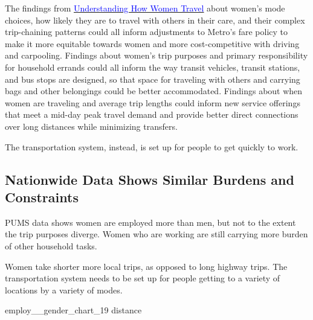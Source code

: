 \documentclass[
  12pt,
]{article}
\newenvironment{Shaded}{\begin{snugshade}}{\end{snugshade}}
\newcommand{\NormalTok}[1]{#1}
\begin{document}
\begin{flushleft}
The findings from \href{https://thesource.metro.net/2019/09/19/metro-releases-understanding-how-women-travel-report/}{\underline{\textcolor{blue}{Understanding How Women Travel}}} about women’s mode choices, how likely they are to travel with others in their care, and their complex trip-chaining patterns could all inform adjustments to Metro’s fare policy to make it more equitable towards women and more cost-competitive with driving and carpooling. Findings about women’s trip purposes and primary responsibility for household errands could all inform the way transit vehicles, transit stations, and bus stops are designed, so that space for traveling with others and carrying bags and other belongings could be better accommodated. Findings about when women are traveling and average trip lengths could inform new service offerings that meet a mid-day peak travel demand and provide better direct connections over long distances while minimizing transfers. 

The transportation system, instead, is set up for people to get quickly to work.
\end{flushleft}

\hypertarget{nationwide-data-shows-similar-burdens-and-constraints}{%
\subsection{Nationwide Data Shows Similar Burdens and
Constraints}\label{nationwide-data-shows-similar-burdens-and-constraints}}

\begin{flushleft}
PUMS data shows women are employed more than men, but not to the extent the trip purposes diverge. Women who are working are still carrying more burden of other household tasks.
\end{flushleft}

\begin{flushleft}
Women take shorter more local trips, as opposed to long highway trips. The transportation system needs to be set up for people getting to a variety of locations by a variety of modes.
\end{flushleft}

\begin{Shaded}
\begin{Highlighting}[]
\NormalTok{employ\_\_gender\_chart\_19}
\NormalTok{distance}
\end{Highlighting}
\end{Shaded}
\end{document}
